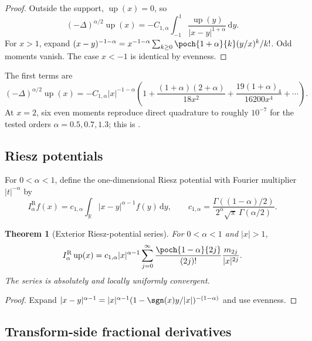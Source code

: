 \documentclass[11pt,oneside]{article}
\newtheorem{theorem}{Theorem}[section]
\theoremstyle{definition}
\theoremstyle{remark}
\newcommand{\Up}{\operatorname{up}}
\newcommand{\R}{\mathbb R}
\newcommand{\dd}{\,\mathrm d}
\newcommand{\1}{\mathbf 1}
\begin{document}
\begin{proof}
Outside the support, $\Up(x)=0$, so
\[
 (-\Delta)^{\alpha/2}\Up(x)
 =-C_{1,\alpha}\int_{-1}^{1}\frac{\Up(y)}{|x-y|^{1+\alpha}}\dd y.
\]
For $x>1$, expand
$(x-y)^{-1-\alpha}=x^{-1-\alpha}\sum_{k\ge0}\poch{1+\alpha}{k}(y/x)^k/k!$.
Odd moments vanish.  The case $x<-1$ is identical by evenness.
\end{proof}

The first terms are
\begin{equation}
 (-\Delta)^{\alpha/2}\Up(x)
 =-C_{1,\alpha}|x|^{-1-\alpha}
 \left(1+\frac{(1+\alpha)(2+\alpha)}{18x^2}
 +\frac{19(1+\alpha)_4}{16200x^4}+\cdots\right).
 \label{p7:eq:fractional-Laplacian-first-terms}
\end{equation}
At $x=2$, six even moments reproduce direct quadrature to roughly $10^{-7}$ for the tested
orders $\alpha=0.5,0.7,1.3$; this is \statusnumeric.

\subsection{Riesz potentials}

For $0<\alpha<1$, define the one-dimensional Riesz potential with Fourier multiplier
$|t|^{-\alpha}$ by
\begin{equation}
 I_\alpha^{\mathrm R}f(x)
 =c_{1,\alpha}\int_{\R}|x-y|^{\alpha-1}f(y)\dd y,
 \qquad
 c_{1,\alpha}=
 \frac{\Gamma((1-\alpha)/2)}{2^\alpha\sqrt\pi\,\Gamma(\alpha/2)}.
 \label{p7:eq:Riesz-potential-def}
\end{equation}

\begin{theorem}[Exterior Riesz-potential series]
\label{p7:thm:Riesz-potential-tail}
For $0<\alpha<1$ and $|x|>1$,
\begin{equation}
 I_\alpha^{\mathrm R}\Up(x)
 =c_{1,\alpha}|x|^{\alpha-1}
 \sum_{j=0}^{\infty}
 \frac{\poch{1-\alpha}{2j}}{(2j)!}
 \frac{m_{2j}}{|x|^{2j}}.
 \label{p7:eq:Riesz-potential-tail}
\end{equation}
The series is absolutely and locally uniformly convergent.
\end{theorem}

\begin{proof}
Expand
$|x-y|^{\alpha-1}=|x|^{\alpha-1}(1-\sgn(x)y/|x|)^{-(1-\alpha)}$ and use evenness.
\end{proof}

\subsection{Transform-side fractional derivatives}
\end{document}
